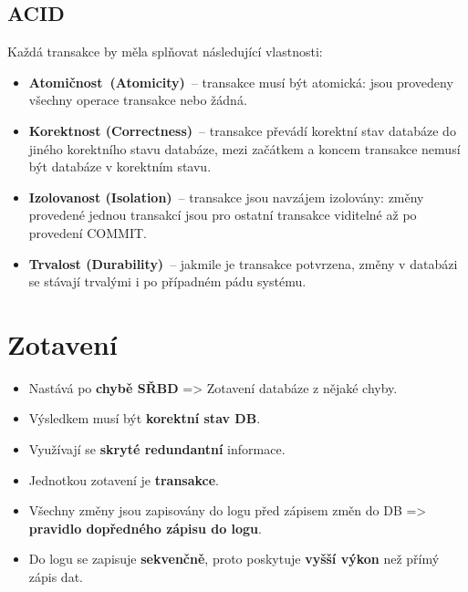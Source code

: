 \subsection{ACID}
Každá transakce by měla splňovat následující vlastnosti:
\begin{itemize}
    \item\textbf{Atomičnost (Atomicity)} -- transakce musí být atomická: jsou provedeny všechny operace transakce nebo žádná.
    \item\textbf{Korektnost (Correctness)} – transakce převádí korektní stav databáze do jiného korektního stavu databáze, mezi začátkem a koncem transakce nemusí být databáze v korektním stavu.
    \item\textbf{Izolovanost (Isolation)} – transakce jsou navzájem izolovány: změny provedené jednou transakcí jsou pro ostatní transakce viditelné až po provedení COMMIT.
    \item\textbf{Trvalost (Durability)} – jakmile je transakce potvrzena, změny v databázi se stávají trvalými i po případném pádu systému.
\end{itemize}

\section{Zotavení}
\begin{itemize}
    \item Nastává po \textbf{chybě SŘBD} => Zotavení databáze z nějaké chyby.
    \item Výsledkem musí být \textbf{korektní stav DB}.
    \item Využívají se\textbf{ skryté redundantní} informace.
    \item Jednotkou zotavení je \textbf{transakce}.
    \item Všechny změny jsou zapisovány do logu před zápisem změn do DB => \textbf{pravidlo dopředného zápisu do logu}.
    \item Do logu se zapisuje \textbf{sekvenčně}, proto poskytuje \textbf{vyšší výkon} než přímý zápis dat.
\end{itemize}

